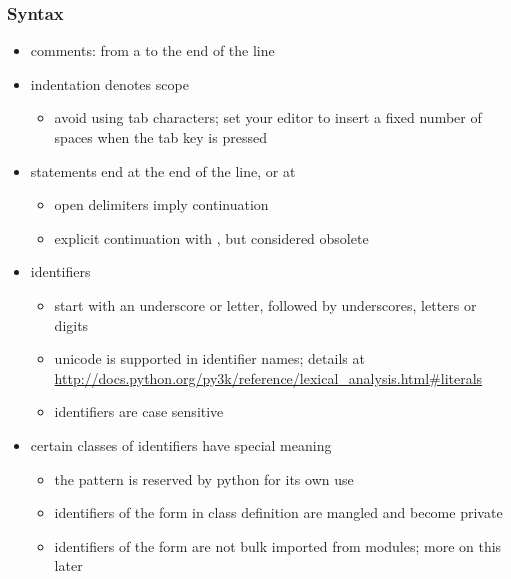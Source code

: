 \begin{frame}[fragile]
%
  \frametitle{Syntax}
%
  \begin{itemize}
%
  \item comments: from a \literal{\#} to the end of the line
%
  \item indentation denotes scope
    \begin{itemize}
    \item avoid using tab characters; set your editor to insert a fixed number of spaces when
      the tab key is pressed
    \end{itemize}
%
  \item statements end at the end of the line, or at \literal{;}
    \begin{itemize}
    \item open delimiters imply continuation
      \item explicit continuation with \literal{$\backslash$}, but considered obsolete
    \end{itemize}
%
  \item identifiers
    \begin{itemize}
    \item start with an underscore or letter, followed by underscores, letters or digits
    \item unicode is supported in identifier names; details at
      {\scriptsize \url{http://docs.python.org/py3k/reference/lexical_analysis.html#literals}}
    \item identifiers are case sensitive
    \end{itemize}
%
  \item certain classes of identifiers have special meaning
    \begin{itemize}
    \item the pattern \literal{\_\_*\_\_} is reserved by python for its own use
    \item identifiers of the form \literal{\_\_*} in class definition are mangled and become
      private
    \item identifiers of the form \literal{\_*} are not bulk imported from modules; more on
      this later
    \end{itemize}
%
  \end{itemize}
%
\end{frame}


